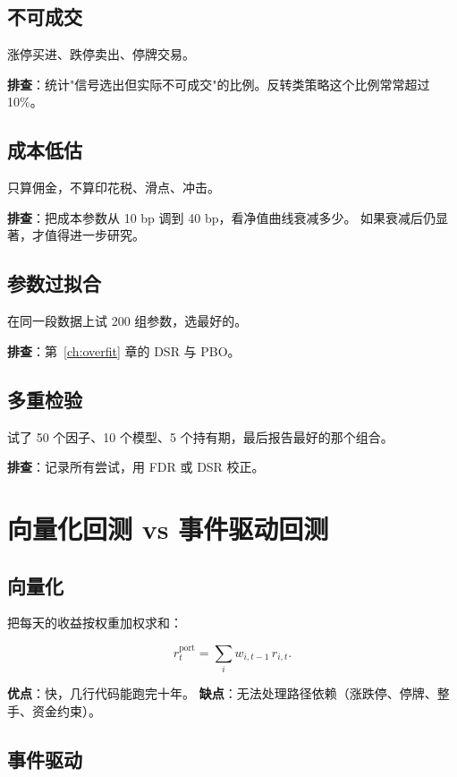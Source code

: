 \subsection{不可成交}

涨停买进、跌停卖出、停牌交易。

\textbf{排查}：统计"信号选出但实际不可成交"的比例。反转类策略这个比例常常超过 10\%。

\subsection{成本低估}

只算佣金，不算印花税、滑点、冲击。

\textbf{排查}：把成本参数从 10 bp 调到 40 bp，看净值曲线衰减多少。
如果衰减后仍显著，才值得进一步研究。

\subsection{参数过拟合}

在同一段数据上试 200 组参数，选最好的。

\textbf{排查}：第~\ref{ch:overfit} 章的 DSR 与 PBO。

\subsection{多重检验}

试了 50 个因子、10 个模型、5 个持有期，最后报告最好的那个组合。

\textbf{排查}：记录所有尝试，用 FDR 或 DSR 校正。

\section{向量化回测 vs 事件驱动回测}

\subsection{向量化}

把每天的收益按权重加权求和：

\begin{equation}
  r^{\text{port}}_t = \sum_i w_{i,t-1}\, r_{i,t}.
\end{equation}

\textbf{优点}：快，几行代码能跑完十年。
\textbf{缺点}：无法处理路径依赖（涨跌停、停牌、整手、资金约束）。

\subsection{事件驱动}

